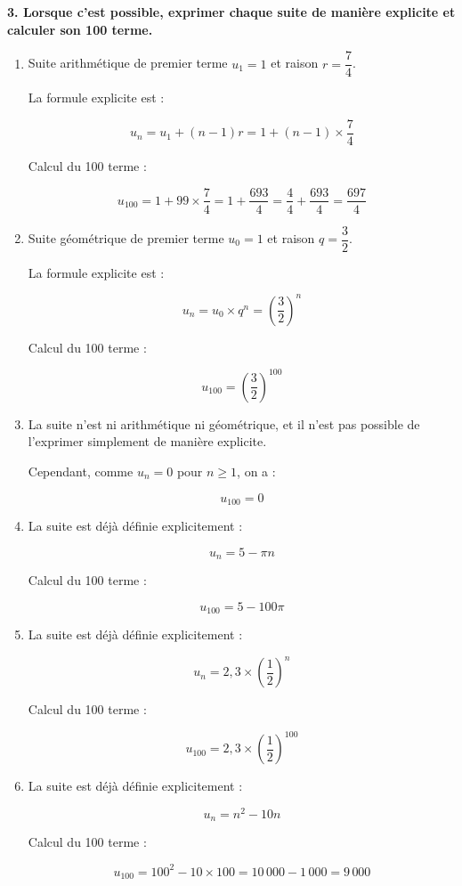 \documentclass{article}
\begin{document}
\bigskip

\textbf{3. Lorsque c'est possible, exprimer chaque suite de manière explicite et calculer son 100\ieme{} terme.}

\begin{enumerate}[label=\alph*)]

\item Suite arithmétique de premier terme \( u_1 = 1 \) et raison \( r = \dfrac{7}{4} \).

La formule explicite est :

\[ u_n = u_1 + (n - 1) r = 1 + (n - 1) \times \dfrac{7}{4} \]

Calcul du 100\ieme{} terme :

\[ u_{100} = 1 + 99 \times \dfrac{7}{4} = 1 + \dfrac{693}{4} = \dfrac{4}{4} + \dfrac{693}{4} = \dfrac{697}{4} \]

\bigskip

\item Suite géométrique de premier terme \( u_0 = 1 \) et raison \( q = \dfrac{3}{2} \).

La formule explicite est :

\[ u_n = u_0 \times q^n = \left( \dfrac{3}{2} \right)^n \]

Calcul du 100\ieme{} terme :

\[ u_{100} = \left( \dfrac{3}{2} \right)^{100} \]

\bigskip

\item La suite n'est ni arithmétique ni géométrique, et il n'est pas possible de l'exprimer simplement de manière explicite.

Cependant, comme \( u_n = 0 \) pour \( n \geq 1 \), on a :

\[ u_{100} = 0 \]

\bigskip

\item La suite est déjà définie explicitement :

\[ u_n = 5 - \pi n \]

Calcul du 100\ieme{} terme :

\[ u_{100} = 5 - 100 \pi \]

\bigskip

\item La suite est déjà définie explicitement :

\[ u_n = 2{,}3 \times \left( \dfrac{1}{2} \right)^n \]

Calcul du 100\ieme{} terme :

\[ u_{100} = 2{,}3 \times \left( \dfrac{1}{2} \right)^{100} \]

\bigskip

\item La suite est déjà définie explicitement :

\[ u_n = n^2 - 10n \]

Calcul du 100\ieme{} terme :

\[ u_{100} = 100^2 - 10 \times 100 = 10\,000 - 1\,000 = 9\,000 \]

\end{enumerate}
\end{document}
